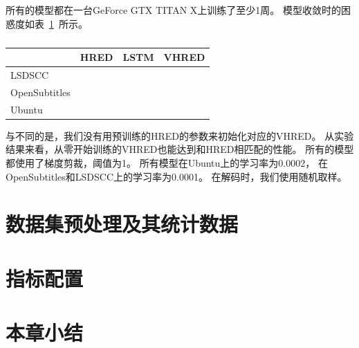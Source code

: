 所有的模型都在一台GeForce GTX TITAN X上训练了至少1周。
模型收敛时的困惑度如表~\ref{tab:converged_perplexity}~所示。
\begin{table}[H]
    \centering
    \caption{}
    \label{tab:converged_perplexity}
    \begin{tabular}{llll}
        \toprule
        & HRED & LSTM & VHRED \\
        \midrule
        LSDSCC & & &  \\
        OpenSubtitles & & &  \\
        Ubuntu & & &  \\
        \bottomrule
    \end{tabular}
\end{table}

与\cite{VHRED}不同的是，我们没有用预训练的HRED的参数来初始化对应的VHRED。
从实验结果来看，从零开始训练的VHRED也能达到和HRED相匹配的性能。
所有的模型都使用了梯度剪裁，阈值为1。
所有模型在Ubuntu上的学习率为0.0002，
在OpenSubtitles和LSDSCC上的学习率为0.0001。
在解码时，我们使用随机取样。

\section{数据集预处理及其统计数据}
\label{sec:dataset_proprecessing}

\section{指标配置}\label{sec:metric_config}

\section{本章小结}\label{sec:method_conclusion}
